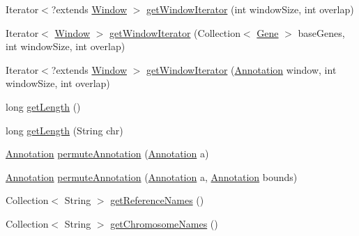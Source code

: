 \begin{DoxyCompactItemize}
\item 
Iterator$<$?extends \hyperlink{interfaceumms_1_1core_1_1feature_1_1_window}{Window} $>$ \hyperlink{interfaceumms_1_1core_1_1coordinatesystem_1_1_coordinate_space_aa948bd7624e066b77fc4603df26023df}{get\+Window\+Iterator} (int window\+Size, int overlap)
\item 
Iterator$<$ \hyperlink{interfaceumms_1_1core_1_1feature_1_1_window}{Window} $>$ \hyperlink{interfaceumms_1_1core_1_1coordinatesystem_1_1_coordinate_space_a5a010c2c047556dea3e8e8004241c341}{get\+Window\+Iterator} (Collection$<$ \hyperlink{classumms_1_1core_1_1annotation_1_1_gene}{Gene} $>$ base\+Genes, int window\+Size, int overlap)
\item 
Iterator$<$?extends \hyperlink{interfaceumms_1_1core_1_1feature_1_1_window}{Window} $>$ \hyperlink{interfaceumms_1_1core_1_1coordinatesystem_1_1_coordinate_space_a7e18c144a21650e18b0aafef1940be7f}{get\+Window\+Iterator} (\hyperlink{interfaceumms_1_1core_1_1annotation_1_1_annotation}{Annotation} window, int window\+Size, int overlap)
\item 
long \hyperlink{interfaceumms_1_1core_1_1coordinatesystem_1_1_coordinate_space_a5a1a16d1a6043ea09efe1084b5a9c84c}{get\+Length} ()
\item 
long \hyperlink{interfaceumms_1_1core_1_1coordinatesystem_1_1_coordinate_space_aa4263d7120f3af839c69144095bd4202}{get\+Length} (String chr)
\item 
\hyperlink{interfaceumms_1_1core_1_1annotation_1_1_annotation}{Annotation} \hyperlink{interfaceumms_1_1core_1_1coordinatesystem_1_1_coordinate_space_a3bf9c42888d19a199c451251c7b96156}{permute\+Annotation} (\hyperlink{interfaceumms_1_1core_1_1annotation_1_1_annotation}{Annotation} a)
\item 
\hyperlink{interfaceumms_1_1core_1_1annotation_1_1_annotation}{Annotation} \hyperlink{interfaceumms_1_1core_1_1coordinatesystem_1_1_coordinate_space_a466ea37fcc195f06df37fb362dee11fb}{permute\+Annotation} (\hyperlink{interfaceumms_1_1core_1_1annotation_1_1_annotation}{Annotation} a, \hyperlink{interfaceumms_1_1core_1_1annotation_1_1_annotation}{Annotation} bounds)
\item 
Collection$<$ String $>$ \hyperlink{interfaceumms_1_1core_1_1coordinatesystem_1_1_coordinate_space_ac00dc2e5986d067615d65301bc93a63b}{get\+Reference\+Names} ()
\item 
Collection$<$ String $>$ \hyperlink{interfaceumms_1_1core_1_1coordinatesystem_1_1_coordinate_space_ae60b7522b8aa973dd48bae33aef80ff0}{get\+Chromosome\+Names} ()
\item 

\end{DoxyCompactItemize}
